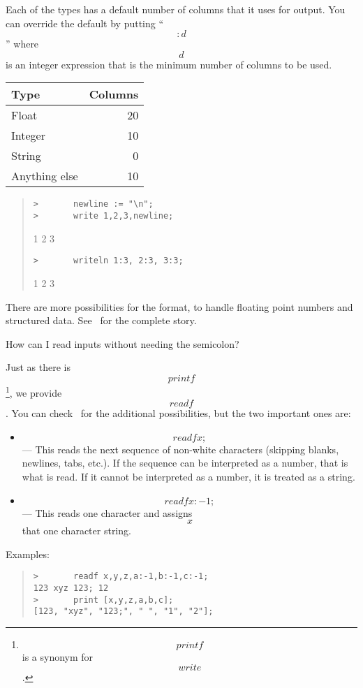 \begin{description}
    Each of the types has a default number of columns that it uses for
    output.  You can override the default by
    putting ``\[:d\]'' where \[d\] is an integer expression that is the
    minimum number of columns to be used.  

\begin{center}
\begin{tabular}{l r }
    Type&	Columns\\\hline
    Float&	20\\
    Integer&	10\\
    String&	0\\
    Anything else&	10
\end{tabular}
\end{center}

\begin{quote}\begin{verbatim}
>       newline := "\n";
>       write 1,2,3,newline;
\end{verbatim}\begin{verbatim*}
         1         2         3
\end{verbatim*}\begin{verbatim}
>       writeln 1:3, 2:3, 3:3;
\end{verbatim}\begin{verbatim*}
  1  2  3
\end{verbatim*}\end{quote}

    There are more possibilities for the format, to handle floating point
    numbers and structured data.  See \Intro\ for the complete story.


    
\Q  How can I read inputs without needing the semicolon?\label{readf}

\A  Just as there is \[printf\]\footnote{%
    \[printf\] is a synonym for \[write\].}, we provide \[readf\].
    You can check \Intro\ for the additional possibilities, but the two
    important ones are: 
    \begin{itemize}
    \item \[readf x;\] --- This reads the next sequence of non-white
	characters (skipping blanks, newlines, tabs, etc.).  If the
	sequence can be interpreted as a number, that is what is read.
	If it cannot be interpreted as a number, it is treated as a string.
    \item \[readf x:-1;\] --- This reads one character and assigns \[x\]
	that one character string.
    \end{itemize}
    Examples:
\begin{quote}\begin{verbatim}
>       readf x,y,z,a:-1,b:-1,c:-1;
123 xyz 123; 12
>       print [x,y,z,a,b,c];
[123, "xyz", "123;", " ", "1", "2"];
\end{verbatim}\end{quote}


\end{description}
